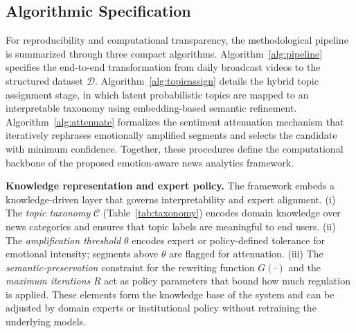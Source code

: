 \documentclass[final,1p,times]{elsarticle}
\begin{document}
\subsection{Algorithmic Specification}

For reproducibility and computational transparency, the methodological pipeline is summarized through three compact algorithms. Algorithm~\ref{alg:pipeline} specifies the end-to-end transformation from daily broadcast videos to the structured dataset $\mathcal{D}$. Algorithm~\ref{alg:topicassign} details the hybrid topic assignment stage, in which latent probabilistic topics are mapped to an interpretable taxonomy using embedding-based semantic refinement. Algorithm~\ref{alg:attenuate} formalizes the sentiment attenuation mechanism that iteratively rephrases emotionally amplified segments and selects the candidate with minimum confidence. Together, these procedures define the computational backbone of the proposed emotion-aware news analytics framework.

\textbf{Knowledge representation and expert policy.} The framework embeds a knowledge-driven layer that governs interpretability and expert alignment. (i) The \emph{topic taxonomy} $\mathcal{C}$ (Table~\ref{tab:taxonomy}) encodes domain knowledge over news categories and ensures that topic labels are meaningful to end users. (ii) The \emph{amplification threshold} $\theta$ encodes expert or policy-defined tolerance for emotional intensity; segments above $\theta$ are flagged for attenuation. (iii) The \emph{semantic-preservation} constraint for the rewriting function $G(\cdot)$ and the \emph{maximum iterations} $R$ act as policy parameters that bound how much regulation is applied. These elements form the knowledge base of the system and can be adjusted by domain experts or institutional policy without retraining the underlying models.
\end{document}
